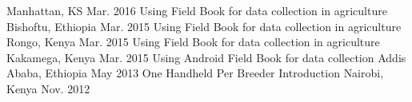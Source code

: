 \begin{cvworkshops}
    {Manhattan, KS} %
    {Mar. 2016} %
  \cvworkshop
    {Using Field Book for data collection in agriculture} %
    {Bishoftu, Ethiopia} %
    {Mar. 2015} %
  \cvworkshop
    {Using Field Book for data collection in agriculture} %
    {Rongo, Kenya} %
    {Mar. 2015} %
  \cvworkshop
    {Using Field Book for data collection in agriculture} %
    {Kakamega, Kenya} %
    {Mar. 2015} %
  \cvworkshop
    {Using Android Field Book for data collection} %
    {Addis Ababa, Ethiopia} %
    {May 2013} %
  \cvworkshop
    {One Handheld Per Breeder Introduction} %
    {Nairobi, Kenya} %
    {Nov. 2012} %
\end{cvworkshops}
